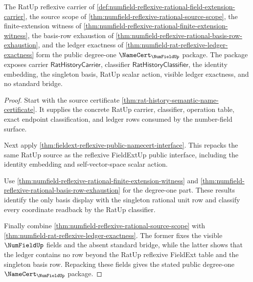 \begin{theorem}
\label{thm:numfield-reflexive-rational-degree-one-public-package}
The RatUp reflexive carrier of
\autoref{def:numfield-reflexive-rational-field-extension-carrier}, the source
scope of \autoref{thm:numfield-reflexive-rational-source-scope}, the
finite-extension witness of
\autoref{thm:numfield-reflexive-rational-finite-extension-witness}, the
basis-row exhaustion of
\autoref{thm:numfield-reflexive-rational-basis-row-exhaustion}, and the ledger
exactness of \autoref{thm:numfield-rat-reflexive-ledger-exactness} form the
public degree-one $\NameCert_{\NumFieldUp}$ package. The package exposes carrier
$\mathsf{RatHistoryCarrier}$, classifier $\mathsf{RatHistoryClassifier}$, the
identity embedding, the singleton basis, RatUp scalar action, visible ledger
exactness, and no standard bridge.
\end{theorem}
\begin{proof}
Start with the source certificate
\autoref{thm:rat-history-semantic-name-certificate}. It supplies the concrete
RatUp carrier, classifier, operation table, exact endpoint classification, and
ledger rows consumed by the number-field surface.

Next apply
\autoref{thm:fieldext-reflexive-public-namecert-interface}. This repacks the
same RatUp source as the reflexive FieldExtUp public interface, including the
identity embedding and self-vector-space scalar action.

Use
\autoref{thm:numfield-reflexive-rational-finite-extension-witness} and
\autoref{thm:numfield-reflexive-rational-basis-row-exhaustion} for the
degree-one part. These results identify the only basis display with the
singleton rational unit row and classify every coordinate readback by the RatUp
classifier.

Finally combine
\autoref{thm:numfield-reflexive-rational-source-scope} with
\autoref{thm:numfield-rat-reflexive-ledger-exactness}. The former fixes the
visible $\NumFieldUp$ fields and the absent standard bridge, while the latter
shows that the ledger contains no row beyond the RatUp reflexive FieldExt table
and the singleton basis row. Repacking these fields gives the stated public
degree-one $\NameCert_{\NumFieldUp}$ package.
\end{proof}

